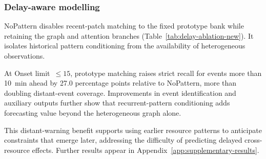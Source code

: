 \documentclass[a4paper,fleqn]{cas-dc}
\begin{document}
\subsubsection{Delay-aware modelling}\label{sec:delay-analysis}

NoPattern disables recent-patch matching to the fixed prototype bank while retaining the graph and attention branches (Table~\ref{tab:delay-ablation-new}). It isolates historical pattern conditioning from the availability of heterogeneous observations.

At Onset limit~$\leq15$, prototype matching raises strict recall for events more than 10~min ahead by 27.0 percentage points relative to NoPattern, more than doubling distant-event coverage. Improvements in event identification and auxiliary outputs further show that recurrent-pattern conditioning adds forecasting value beyond the heterogeneous graph alone.

This distant-warning benefit supports using earlier resource patterns to anticipate constraints that emerge later, addressing the difficulty of predicting delayed cross-resource effects. Further results appear in Appendix~\ref{app:supplementary-results}.
\end{document}
